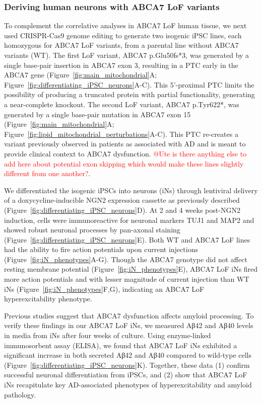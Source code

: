 \subsubsection{Deriving human neurons with ABCA7 LoF variants}
To complement the correlative analyses in ABCA7 LoF human tissue, we next used CRISPR-Cas9 genome editing to generate two isogenic iPSC lines, each homozygous for ABCA7 LoF variants, from a parental line without ABCA7 variants (WT). The first LoF variant, ABCA7 p.Glu50fs*3, was generated by a single base-pair insertion in ABCA7 exon 3, resulting in a PTC early in the ABCA7 gene (Figure~\ref{fig:main_mitochondrial}A; Figure~\ref{fig:differentiating_iPSC_neurons}A-C). This 5'-proximal PTC limits the possibility of producing a truncated protein with partial functionality, generating a near-complete knockout. The second LoF variant, ABCA7 p.Tyr622*, was generated by a single base-pair mutation in ABCA7 exon 15 (Figure~\ref{fig:main_mitochondrial}A; Figure~\ref{fig:lipid_mitochondrial_perturbations}A-C). This PTC re-creates a variant previously observed in patients as associated with AD \cite{Steinberg2015-mu} and is meant to provide clinical context to ABCA7 dysfunction. \textcolor{red}{@Ute is there anything else to add here about potential exon skipping which would make these lines slightly different from one another?}.

We differentiated the isogenic iPSCs into neurons (iNs) through lentiviral delivery of a doxycycline-inducible NGN2 expression cassette as previously described\cite{Ho2016-kz} (Figure~\ref{fig:differentiating_iPSC_neurons}D). At 2 and 4 weeks post-NGN2 induction, cells were immunoreactive for neuronal markers TUJ1 and MAP2 and showed robust neuronal processes by pan-axonal staining (Figure~\ref{fig:differentiating_iPSC_neurons}E). Both WT and ABCA7 LoF lines had the ability to fire action potentials upon current injections (Figure~\ref{fig:iN_phenotypes}A-G). Though the ABCA7 genotype did not affect resting membrane potential (Figure~\ref{fig:iN_phenotypes}E), ABCA7 LoF iNs fired more action potentials and with lesser magnitude of current injection than WT iNs (Figure~\ref{fig:iN_phenotypes}F,G), indicating an ABCA7 LoF hyperexcitability phenotype. 

Previous studies suggest that ABCA7 dysfunction affects amyloid processing\cite{Satoh2015-yu,Sakae2016-uy,Bamji-Mirza2018-xt,Chan2008-qu,De_Roeck2018-zx}. To verify these findings in our ABCA7 LoF iNs, we measured Aβ42 and Aβ40 levels in media from iNs after four weeks of culture. Using enzyme-linked immunosorbent assay (ELISA), we found that ABCA7 LoF iNs exhibited a significant increase in both secreted Aβ42 and Aβ40 compared to wild-type cells (Figure~\ref{fig:differentiating_iPSC_neurons}K). Together, these data (1) confirm successful neuronal differentiation from iPSCs, and (2) show that ABCA7 LoF iNs recapitulate key AD-associated phenotypes of hyperexcitability and amyloid pathology.


